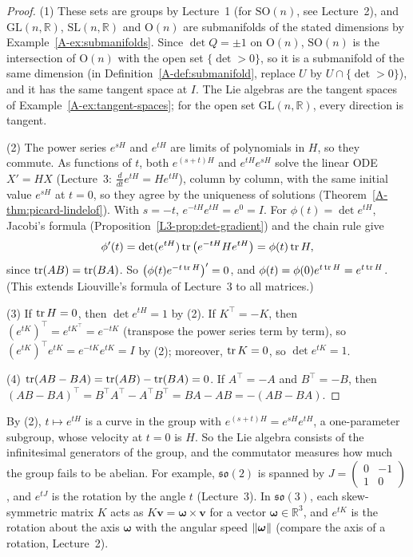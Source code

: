 \begin{proof}
    (1) These sets are groups by Lecture~1 (for $\mathrm{SO}(n)$, see Lecture~2), and $\mathrm{GL}(n, \mathbb{R})$, $\mathrm{SL}(n, \mathbb{R})$ and $\mathrm{O}(n)$ are submanifolds of the stated dimensions by Example~\ref{A-ex:submanifolds}. Since $\det Q = \pm 1$ on $\mathrm{O}(n)$, $\mathrm{SO}(n)$ is the intersection of $\mathrm{O}(n)$ with the open set $\{\det > 0\}$, so it is a submanifold of the same dimension (in Definition~\ref{A-def:submanifold}, replace $U$ by $U \cap \{\det > 0\}$), and it has the same tangent space at $I$. The Lie algebras are the tangent spaces of Example~\ref{A-ex:tangent-spaces}; for the open set $\mathrm{GL}(n, \mathbb{R})$, every direction is tangent.

    (2) The power series $e^{sH}$ and $e^{tH}$ are limits of polynomials in $H$, so they commute. As functions of $t$, both $e^{(s+t)H}$ and $e^{tH}e^{sH}$ solve the linear ODE $X' = HX$ (Lecture~3: $\frac{d}{dt}e^{tH} = He^{tH}$), column by column, with the same initial value $e^{sH}$ at $t = 0$, so they agree by the uniqueness of solutions (Theorem~\ref{A-thm:picard-lindelof}). With $s = -t$, $e^{-tH}e^{tH} = e^0 = I$. For $\phi(t) = \det e^{tH}$, Jacobi's formula (Proposition~\ref{L3-prop:det-gradient}) and the chain rule give
    \[\phi'(t) = \det(e^{tH})\operatorname{tr}\big(e^{-tH}He^{tH}\big) = \phi(t)\operatorname{tr} H,\]
    since $\operatorname{tr}(AB) = \operatorname{tr}(BA)$. So $\big(\phi(t)e^{-t\operatorname{tr} H}\big)' = 0$, and $\phi(t) = \phi(0)e^{t\operatorname{tr} H} = e^{t\operatorname{tr} H}$. (This extends Liouville's formula of Lecture~3 to all matrices.)

    (3) If $\operatorname{tr} H = 0$, then $\det e^{tH} = 1$ by (2). If $K^\top = -K$, then $(e^{tK})^\top = e^{tK^\top} = e^{-tK}$ (transpose the power series term by term), so $(e^{tK})^\top e^{tK} = e^{-tK}e^{tK} = I$ by (2); moreover, $\operatorname{tr} K = 0$, so $\det e^{tK} = 1$.

    (4) $\operatorname{tr}(AB - BA) = \operatorname{tr}(AB) - \operatorname{tr}(BA) = 0$. If $A^\top = -A$ and $B^\top = -B$, then $(AB - BA)^\top = B^\top A^\top - A^\top B^\top = BA - AB = -(AB - BA)$.
\end{proof}

By (2), $t \mapsto e^{tH}$ is a curve in the group with $e^{(s+t)H} = e^{sH}e^{tH}$, a one-parameter subgroup, whose velocity at $t = 0$ is $H$. So the Lie algebra consists of the infinitesimal generators of the group, and the commutator measures how much the group fails to be abelian. For example, $\mathfrak{so}(2)$ is spanned by $J = \begin{pmatrix} 0 & -1 \\ 1 & 0 \end{pmatrix}$, and $e^{tJ}$ is the rotation by the angle $t$ (Lecture~3). In $\mathfrak{so}(3)$, each skew-symmetric matrix $K$ acts as $K\mathbf{v} = \boldsymbol{\omega} \times \mathbf{v}$ for a vector $\boldsymbol{\omega} \in \mathbb{R}^3$, and $e^{tK}$ is the rotation about the axis $\boldsymbol{\omega}$ with the angular speed $\lVert \boldsymbol{\omega} \rVert$ (compare the axis of a rotation, Lecture~2).

